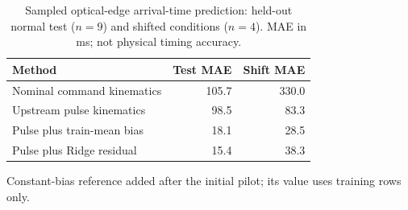 \begin{table}[t]
\caption{Sampled optical-edge arrival-time prediction: held-out normal test ($n=9$) and shifted conditions ($n=4$). MAE in ms; not physical timing accuracy.}
\label{tab:eta-ml}
\centering\small
\begin{tabular}{lrr}
\toprule
Method & Test MAE & Shift MAE\\
\midrule
Nominal command kinematics & 105.7 & 330.0\\
Upstream pulse kinematics & 98.5 & 83.3\\
Pulse plus train-mean bias & 18.1 & 28.5\\
Pulse plus Ridge residual & 15.4 & 38.3\\
\bottomrule
\end{tabular}
\par\smallskip\footnotesize Constant-bias reference added after the initial pilot; its value uses training rows only.
\end{table}
